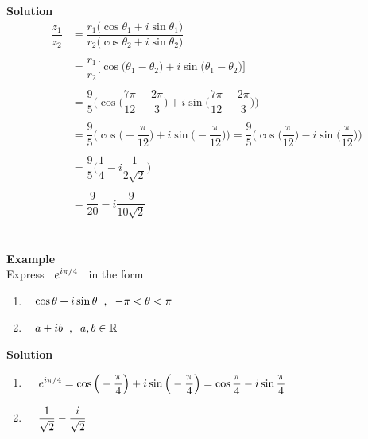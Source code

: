\documentclass[11pt,a4paper]{article}
\begin{document}
\begin{enumerate}
\textbf{Solution}
\begin{align*}
\dfrac{z_1}{z_2} & = \dfrac{r_1\big(\cos \theta_1 + i\sin \theta_1\big)}{r_2\big( \cos \theta_2 + i\sin \theta_2\big)}\\\\
& = \dfrac{r_1}{r_2}\big[\cos \big(\theta_1-\theta_2\big) + i\sin \big(\theta_1-\theta_2\big)\big]\\\\
& = \dfrac{9}{5}\Bigg( \cos \Big(\dfrac{7\pi}{12} - \dfrac{2\pi}{3}\Big) + i \sin \Big(\dfrac{7\pi}{12} - \dfrac{2\pi}{3}\Big)\Bigg)\\\\
& = \dfrac{9}{5}\Bigg( \cos \Big( - \dfrac{\pi}{12}\Big) + i \sin \Big( - \dfrac{\pi}{12}\Big)\Bigg)
 = \dfrac{9}{5}\Bigg( \cos \Big(\dfrac{\pi}{12}\Big) - i \sin \Big(\dfrac{\pi}{12}\Big)\Bigg)\\\\
& = \dfrac{9}{5}\Bigg( \dfrac{1}{4} - i\dfrac{1}{2\sqrt{2}}\Bigg)\\\\
& = \dfrac{9}{20}- i\dfrac{9}{10\sqrt{2}}\\\\\\\\\
\end{align*}
\end{enumerate}



\textbf{Example}\\
Express $\hspace{0.2cm}\displaystyle{e^{i\pi / 4}\hspace{0.2cm}}$ in the form
\begin{enumerate}
\item $\hspace{0.3cm} \cos \theta + i\sin \theta \hspace{0.2cm}, \hspace{0.2cm}  -\pi < \theta < \pi$

\item $\hspace{0.3cm} a + ib\hspace{0.2cm}, \hspace{0.2cm} a,b\in \mathbb{R}$\\
\end{enumerate}



\textbf{Solution}
\begin{enumerate}
\item $\hspace{0.4cm} \displaystyle{e^{i\pi/4} = \cos \Big(-\dfrac{\pi}{4}\Big) + i\sin \Big(-\dfrac{\pi}{4}\Big) = \cos \dfrac{\pi}{4} - i\sin \dfrac{\pi}{4}}$\\

\item $\hspace{0.4cm} \dfrac{1}{\sqrt{2}} - \dfrac{i}{\sqrt{2}}$\\\\
\end{enumerate}
\end{document}
